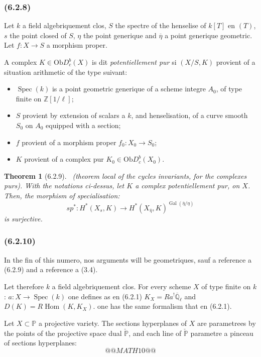 \documentclass[12pt,a4paper]{article}
\theoremstyle{plain}
\newtheorem{theorem}{Theorem}[section]
\theoremstyle{definition}
\theoremstyle{remark}
\newcommand{\Ob}{\mathrm{Ob}}
\DeclareMathOperator{\Hom}{Hom}
\DeclareMathOperator{\Gal}{Gal}
\DeclareMathOperator{\Spec}{Spec}
\newcommand{\bbZ}{\mathbb{Z}}
\newcommand{\bbP}{\mathbb{P}}
\newcommand{\Qlb}{\overline{\mathbb{Q}}_\ell}
\begin{document}
\subsubsection*{\textup{(6.2.8)}}

Let $k$ a field algebriquement clos, $S$ the spectre of the henselise of $k[T]$ en $(T)$, $s$ the point closed of $S$, $\eta$ the point generique and $\overline{\eta}$ a point generique geometric. Let $f : X \to S$ a morphism proper.

A complex $K \in \Ob D_c^b(X)$ is dit \emph{potentiellement pur} si $(X/S, K)$ provient of a situation arithmetic of the type suivant:
\begin{itemize}
\item[$a)$] $\Spec(k)$ is a point geometric generique of a scheme integre $A_0$, of type finite on $\bbZ[1/\ell]$;
\item[$b)$] $S$ provient by extension of scalars a $k$, and henselisation, of a curve smooth $S_0$ on $A_0$ equipped with a section;
\item[$c)$] $f$ provient of a morphism proper $f_0 : X_0 \to S_0$;
\item[$d)$] $K$ provient of a complex pur $K_0 \in \Ob D_c^b(X_0)$.
\end{itemize}

\begin{theorem}[6.2.9]\ \textup{(theorem local of the cycles invariants, for the complexes purs).}
With the notations ci-dessus, let $K$ a complex potentiellement pur, on $X$. Then, the morphism of specialisation:
\[
sp^* : H^*(X_s, K) \to H^*(X_{\overline{\eta}}, K)^{\Gal(\overline{\eta}/\eta)}
\]
is surjective.
\end{theorem}

\subsubsection*{\textup{(6.2.10)}}

In the fin of this numero, nos arguments will be geometriques, sauf a reference a (6.2.9) and a reference a (3.4).

Let therefore $k$ a field algebriquement clos. For every scheme $X$ of type finite on $k$: $a : X \to \Spec(k)$ one defines as en (6.2.1) $K_X = Ra^! \Qlb$ and $D(K) = R\Hom(K, K_X)$. one has the same formalism that en (6.2.1).

Let $X \subset \bbP$ a projective variety. The sections hyperplanes of $X$ are parametrees by the points of the projective space dual $\check{\bbP}$, and each line of $\check{\bbP}$ parametre a pinceau of sections hyperplanes:
\[
@@MATH10@@
\tag{6.2.10.1}
\]
\end{document}
